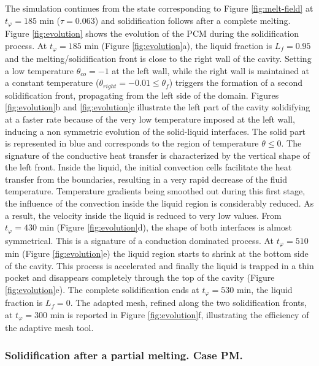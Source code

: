 The simulation continues from the state corresponding to Figure  \ref{fig:melt-field} at $t_{\varphi} =185$ min ($\tau=0.063$) and solidification follows after a complete melting. 
 Figure \ref{fig:evolution} shows the evolution of the PCM during the solidification process. At  $t_{\varphi}  =185$ min     (Figure \ref{fig:evolution}a), the liquid fraction is $L_f=0.95$ and the melting/solidification front is close to the right wall of the cavity. Setting a low temperature $\theta_{co} = -1$ at the left wall, while the right wall is maintained at a constant temperature ($\theta_{right} = -0.01 \leq \theta_f$) triggers the formation of a second solidification front, propagating from the left side of the domain. 
Figures \ref{fig:evolution}b and \ref{fig:evolution}c illustrate the left part of the cavity solidifying at a faster rate because of the very low temperature imposed at the left wall, inducing a non symmetric evolution of the solid-liquid interfaces.
The solid part is represented in blue and corresponds to the region of temperature $\theta \leq 0$.
The signature of the conductive heat transfer is characterized by the vertical shape of the left front.
Inside the liquid, the initial convection cells facilitate the heat transfer from the boundaries, resulting in a very rapid decrease of the fluid temperature. 
Temperature gradients being smoothed out during this first stage, the influence of the convection inside the liquid region is considerably reduced. As a result, the velocity inside the liquid is reduced to very low values. 
From $t_{\varphi} = 430$ min (Figure \ref{fig:evolution}d), the shape of both interfaces is almost symmetrical. 
This is a signature of a conduction dominated process. 
At $t_{\varphi} = 510$ min (Figure \ref{fig:evolution}e) the liquid region starts to shrink at the bottom side of the cavity. This process is accelerated and finally the liquid is trapped in a thin pocket and disappears completely through the top of the cavity (Figure \ref{fig:evolution}e). The complete solidification ends at $t_{\varphi} = 530$ min, \ie the liquid fraction is $L_f=0$.  
The adapted mesh, refined along the two solidification fronts, at $t_{\varphi} = 300$ min is reported in Figure \ref{fig:evolution}f, illustrating the efficiency of the adaptive mesh tool.


\subsubsection{Solidification after a partial melting. Case PM.} \label{sec_solid_partial} 

